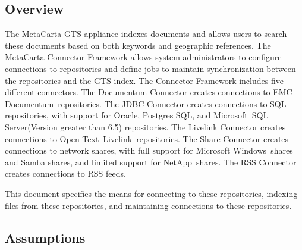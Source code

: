 %
%

\begin{changemargin}{1.5in}{0in}

\section{Overview}

The MetaCarta GTS appliance indexes documents and allows users
to search these documents based on both keywords and geographic
references. The MetaCarta Connector Framework allows system
administrators to configure connections to repositories and define
jobs to maintain synchronization between the repositories and the GTS
index. The Connector Framework includes five different connectors. The
Documentum Connector creates connections to EMC\circler\linebreak
Documentum\circler~repositories. The JDBC Connector creates connections
to SQL repositories, with support for Oracle\circler, Postgres SQL,
and Microsoft\circler~SQL Server\circler\linebreak (Version greater
than 6.5) repositories.  The Livelink Connector creates connections to
Open Text\circler~Livelink\circler~repositories. The Share Connector
creates connections to network shares, with full support for Microsoft
Windows\circler~shares and Samba shares, and limited support for
NetApp\circler~shares. The RSS Connector creates connections to RSS feeds.

This document specifies the means for connecting to these repositories,
indexing files from these repositories, and maintaining connections to
these repositories.

\subsection{Assumptions}


\end{changemargin}
